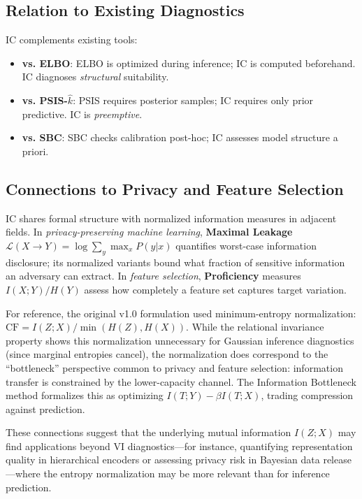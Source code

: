 \documentclass[10pt]{article} %
\theoremstyle{plain}
\theoremstyle{definition}
\begin{document}
\subsection{Relation to Existing Diagnostics}

IC complements existing tools:
\begin{itemize}
    \item \textbf{vs. ELBO}: ELBO is optimized during inference; IC is computed beforehand. IC diagnoses \emph{structural} suitability.
    \item \textbf{vs. PSIS-$\hat{k}$}: PSIS requires posterior samples; IC requires only prior predictive. IC is \emph{preemptive}.
    \item \textbf{vs. SBC}: SBC checks calibration post-hoc; IC assesses model structure a priori.
\end{itemize}

\subsection{Connections to Privacy and Feature Selection}

IC shares formal structure with normalized information measures in adjacent fields. In \emph{privacy-preserving machine learning}, \textbf{Maximal Leakage} $\mathcal{L}(X \to Y) = \log \sum_y \max_x P(y|x)$ quantifies worst-case information disclosure; its normalized variants bound what fraction of sensitive information an adversary can extract. In \emph{feature selection}, \textbf{Proficiency} measures $I(X;Y)/H(Y)$ assess how completely a feature set captures target variation.

For reference, the original v1.0 formulation used minimum-entropy normalization: $\text{CF} = I(Z;X)/\min(H(Z),H(X))$. While the relational invariance property shows this normalization unnecessary for Gaussian inference diagnostics (since marginal entropies cancel), the normalization does correspond to the ``bottleneck'' perspective common to privacy and feature selection: information transfer is constrained by the lower-capacity channel. The Information Bottleneck method \citep{tishby1999information} formalizes this as optimizing $I(T;Y) - \beta I(T;X)$, trading compression against prediction.

These connections suggest that the underlying mutual information $I(Z;X)$ may find applications beyond VI diagnostics---for instance, quantifying representation quality in hierarchical encoders or assessing privacy risk in Bayesian data release---where the entropy normalization may be more relevant than for inference prediction.
\end{document}
